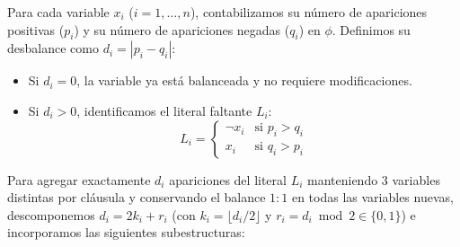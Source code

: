 Para cada variable $x_i$ ($i = 1, \dots, n$), contabilizamos su número de apariciones positivas ($p_i$) y su número de apariciones negadas ($q_i$) en $\phi$. Definimos su desbalance como $d_i = |p_i - q_i|$:

\begin{itemize}[leftmargin=*]
    \item Si $d_i = 0$, la variable ya está balanceada y no requiere modificaciones.
    \item Si $d_i > 0$, identificamos el literal faltante $L_i$:
    \[ L_i = \begin{cases} \neg x_i & \text{si } p_i > q_i \\ x_i & \text{si } q_i > p_i \end{cases} \]
\end{itemize}

Para agregar exactamente $d_i$ apariciones del literal $L_i$ manteniendo $3$ variables distintas por cláusula y conservando el balance $1:1$ en todas las variables nuevas, descomponemos $d_i = 2k_i + r_i$ (con $k_i = \lfloor d_i / 2 \rfloor$ y $r_i = d_i \bmod 2 \in \{0, 1\}$) e incorporamos las siguientes subestructuras:

